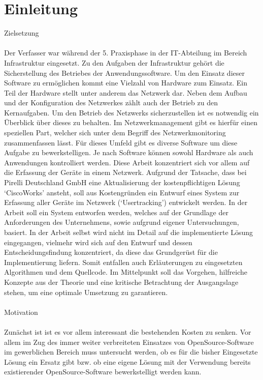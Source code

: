 \chapter{Einleitung}
\label{cha:Einleitung}

Zielsetzung\\
\\
Der Verfasser war während der 5. Praxisphase in der IT-Abteilung im Bereich Infrastruktur eingesetzt.
Zu den Aufgaben der Infrastruktur gehört die Sicherstellung des Betriebes der Anwendungssoftware. Um den Einsatz dieser Software zu ermöglichen kommt eine Vielzahl von Hardware zum Einsatz. Ein Teil der Hardware stellt unter anderem das Netzwerk dar. Neben dem Aufbau und der Konfiguration des Netzwerkes zählt auch der Betrieb zu den Kernaufgaben. Um den Betrieb des Netzwerks sicherzustellen ist es notwendig ein Überblick über dieses zu behalten.
Im Netzwerkmanagement gibt es hierfür einen speziellen Part, welcher sich unter dem Begriff des Netzwerkmonitoring zusammenfassen lässt. Für dieses Umfeld gibt es diverse Software um diese Aufgabe zu bewerkstelligen. Je nach Software können sowohl Hardware als auch Anwendungen kontrolliert werden. Diese Arbeit konzentriert sich vor allem auf die Erfassung der Geräte in einem Netzwerk. Aufgrund der Tatsache, dass bei Pirelli Deutschland GmbH eine Aktualisierung der kostenpflichtigen Lösung ‘CiscoWorks’ ansteht, soll aus Kostengründen ein Entwurf eines System zur Erfassung aller Geräte im Netzwerk (‘Usertracking’) entwickelt werden.
In der Arbeit soll ein System entworfen werden, welches auf der Grundlage der Anforderungen des Unternehmens, sowie aufgrund eigener Untersuchungen, basiert. In der Arbeit selbst wird nicht im Detail auf die implementierte Lösung eingegangen, vielmehr wird sich auf den Entwurf und dessen Entscheidungsfindung konzentriert, da diese das Grundgerüst für die Implementierung liefern. Somit entfallen auch Erläuterungen zu eingesetzten Algorithmen und dem Quellcode.
Im Mittelpunkt soll das Vorgehen, hilfreiche Konzepte aus der Theorie und eine kritische Betrachtung der Ausgangslage stehen, um eine optimale Umsetzung zu garantieren.\\
\\
Motivation\\
\\
Zunächst ist ist es vor allem interessant die bestehenden Kosten zu senken. Vor allem im Zug des immer weiter verbreiteten Einsatzes von OpenSource-Software im gewerblichen Bereich muss untersucht werden, ob es für die bisher Eingesetzte Lösung ein Ersatz gibt bzw. ob eine eigene Lösung mit der Verwendung bereits existierender OpenSource-Software bewerkstelligt werden kann.
